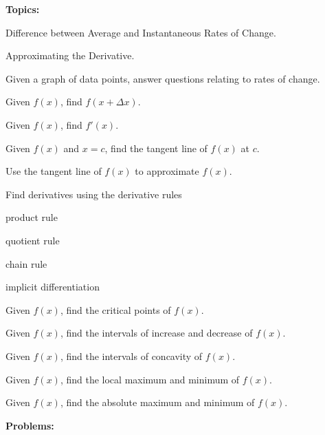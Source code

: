 \documentclass[11pt]{article}
\renewenvironment{itemize}{
  \begin{list}{}{
    \setlength{\leftmargin}{1em}
  }
}{
  \end{list}
}
\begin{document}


{\bf Topics:}

\vspace{0.2cm}

\begin{itemize}
	\item[$\Box$] Difference between Average and Instantaneous Rates of Change.
	\item[$\Box$] Approximating the Derivative.
	\item[$\Box$] Given a graph of data points, answer questions relating to rates of change.
	\item[$\Box$] Given $f(x)$, find $f(x+\Delta x)$.
	\item[$\Box$] Given $f(x)$, find $f'(x)$.
	\item[$\Box$] Given $f(x)$ and $x=c$, find the tangent line of $f(x)$ at $c$.
	\item[$\Box$] Use the tangent line of $f(x)$ to approximate $f(x)$.
	\item[$\Box$] Find derivatives using the derivative rules 
		\begin{itemize}
			\item[$\succ$] product rule
			\item[$\succ$] quotient rule
			\item[$\succ$] chain rule
			\item[$\succ$] implicit differentiation
		\end{itemize}
	\item[$\Box$] Given $f(x)$, find the critical points of $f(x)$.
	\item[$\Box$] Given $f(x)$, find the intervals of increase and decrease of $f(x)$.
	\item[$\Box$] Given $f(x)$, find the intervals of concavity of $f(x)$.
	\item[$\Box$] Given $f(x)$, find the local maximum and minimum of $f(x)$.
	\item[$\Box$] Given $f(x)$, find the absolute maximum and minimum of $f(x)$.
\end{itemize}

\vspace{0.2cm}

\setcounter{N}{0}

{\bf Problems:} 
\end{document}
